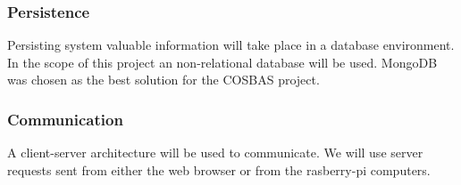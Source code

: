 \subsubsection{Persistence}
Persisting system valuable information will take place in a database environment. In the scope of this project an non-relational database will be used. MongoDB was chosen as the best solution for the COSBAS project.

\subsubsection{Communication}
A client-server architecture will be used to communicate. We will use server requests sent from either the web browser or from the rasberry-pi computers.
